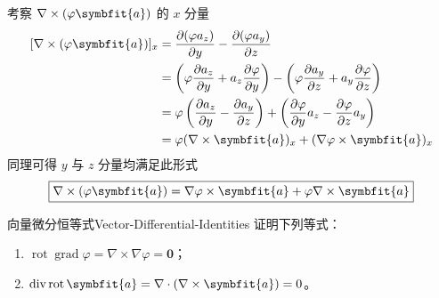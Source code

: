 \begin{myproof}

    考察 $\nabla \times (\varphi \symbfit{a})$ 的 $x$ 分量
    \begin{equation}
        \begin{aligned}
            \relax [\nabla \times (\varphi \symbfit{a})]_x & = \frac{\partial (\varphi a_z)}{\partial y} - \frac{\partial (\varphi a_y)}{\partial z}                                                                                                               \\
                                                           & = \left( \varphi \frac{\partial a_z}{\partial y} + a_z \frac{\partial \varphi}{\partial y} \right) - \left( \varphi \frac{\partial a_y}{\partial z} + a_y \frac{\partial \varphi}{\partial z} \right) \\
                                                           & = \varphi \left( \frac{\partial a_z}{\partial y} - \frac{\partial a_y}{\partial z} \right) + \left( \frac{\partial \varphi}{\partial y} a_z - \frac{\partial \varphi}{\partial z} a_y \right)         \\
                                                           & = \varphi (\nabla \times \symbfit{a})_x + (\nabla \varphi \times \symbfit{a})_x
        \end{aligned}
    \end{equation}
    同理可得 $y$ 与 $z$ 分量均满足此形式
    \begin{equation}
        \boxed{\nabla \times (\varphi \symbfit{a}) = \nabla \varphi \times \symbfit{a} + \varphi \nabla \times \symbfit{a}}
    \end{equation}
\end{myproof}


\begin{problem}{向量微分恒等式}{Vector-Differential-Identities}
    证明下列等式：
    \begin{enumerate}
        \item $\operatorname{rot} \operatorname{grad} \varphi = \nabla \times \nabla \varphi = \symbf{0}$；
        \item $\operatorname{div} \operatorname{rot} \symbfit{a} = \nabla \cdot (\nabla \times \symbfit{a}) = 0$。
    \end{enumerate}
\end{problem}

